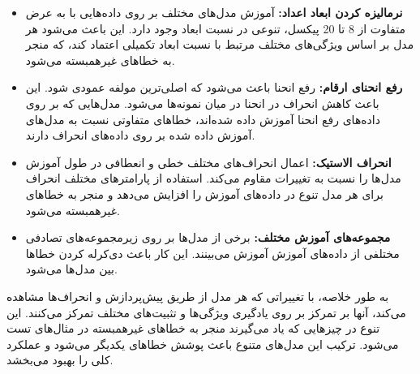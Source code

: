 \begin{enumerate}
{\begin{qsolve}[]
              \begin{itemize}
                \item \textbf{نرمالیزه کردن ابعاد اعداد: } آموزش مدل‌های مختلف بر روی داده‌هایی با  به عرض متفاوت از 8 تا 20 پیکسل، تنوعی در نسبت ابعاد وجود دارد. این باعث می‌شود هر مدل بر اساس ویژگی‌های مختلف مرتبط با نسبت ابعاد تکمیلی اعتماد کند، که منجر به خطاهای غیرهمبسته می‌شود.
                \item \textbf{رفع انحنای ارقام: } رفع انحنا باعث می‌شود که اصلی‌ترین مولفه عمودی شود. این باعث کاهش انحراف در انحنا در میان نمونه‌ها می‌شود. مدل‌هایی که بر روی داده‌های رفع انحنا آموزش داده شده‌اند، خطاهای متفاوتی نسبت به مدل‌های آموزش داده شده بر روی داده‌های انحراف دارند.
                \item \textbf{انحراف الاستیک: } اعمال انحراف‌های مختلف خطی و انعطافی در طول آموزش مدل‌ها را نسبت به تغییرات مقاوم می‌کند. استفاده از پارامترهای مختلف انحراف برای هر مدل تنوع در داده‌های آموزش را افزایش می‌دهد و منجر به خطاهای غیرهمبسته می‌شود.
                \item \textbf{مجموعه‌های آموزش مختلف: } برخی از مدل‌ها بر روی زیرمجموعه‌های تصادفی مختلفی از داده‌های آموزش آموزش می‌بینند. این کار باعث دی‌کرله کردن خطاها بین مدل‌ها می‌شود.
              \end{itemize}

		      به طور خلاصه، با تغییراتی که هر مدل از طریق پیش‌پردازش و انحراف‌ها مشاهده می‌کند، آنها بر تمرکز بر روی یادگیری ویژگی‌ها و تثبیت‌های مختلف تمرکز می‌کنند. این تنوع در چیزهایی که یاد می‌گیرند منجر به خطاهای غیرهمبسته در مثال‌های تست می‌شود. ترکیب این مدل‌های متنوع باعث پوشش خطاهای یکدیگر می‌شود و عملکرد کلی را بهبود می‌بخشد.
	      \end{qsolve}
	      }
\end{enumerate}